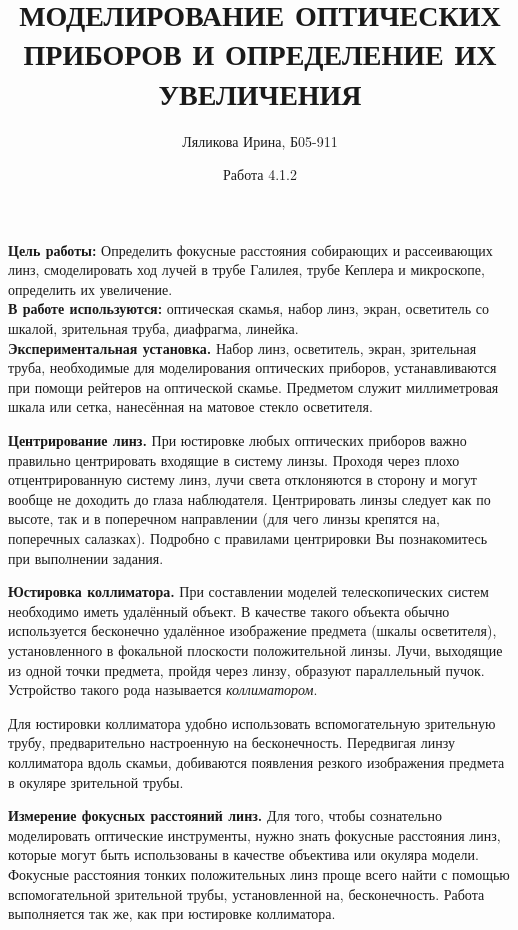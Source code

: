 \documentclass[a4paper,12pt]{article}
\title{МОДЕЛИРОВАНИЕ ОПТИЧЕСКИХ ПРИБОРОВ И ОПРЕДЕЛЕНИЕ ИХ УВЕЛИЧЕНИЯ}
\date{Работа 4.1.2}
\author{Ляликова Ирина, Б05-911}
\begin{document}
	
	\vspace{0.5 cm}
	\maketitle
	\vspace{0.5 cm}
	
	\textbf{Цель работы:} Определить фокусные расстояния собирающих и рассеивающих линз, смоделировать ход лучей в трубе Галилея, трубе Кеплера и микроскопе, определить их увеличение. \\
	
	\textbf{В работе используются:} оптическая скамья, набор линз, экран, осветитель со шкалой, зрительная труба, диафрагма, линейка.\\
	
	\textbf{Экспериментальная установка.} Набор линз, осветитель, экран, зрительная труба, необходимые для моделирования оптических приборов, устанавливаются при помощи рейтеров на оптической скамье. Предметом служит
	миллиметровая шкала или сетка, нанесённая на матовое стекло осветителя.
	
	\textbf{Центрирование линз.} При юстировке любых оптических приборов важно правильно центрировать входящие в систему линзы. Проходя через плохо
	отцентрированную систему линз, лучи света отклоняются в сторону и могут
	вообще не доходить до глаза наблюдателя. Центрировать линзы следует как
	по высоте, так и в поперечном направлении (для чего линзы крепятся на, поперечных салазках). Подробно с правилами центрировки Вы познакомитесь
	при выполнении задания.
	
	\textbf{Юстировка коллиматора.} При составлении моделей телескопических
	систем необходимо иметь удалённый объект. В качестве такого объекта обычно используется бесконечно удалённое изображение предмета (шкалы осветителя), установленного в фокальной плоскости положительной линзы. Лучи,
	выходящие из одной точки предмета, пройдя через линзу, образуют параллельный пучок. Устройство такого рода называется \textit{коллиматором}.

	Для юстировки коллиматора удобно использовать вспомогательную зрительную трубу, предварительно настроенную на бесконечность. Передвигая
	линзу коллиматора вдоль скамьи, добиваются появления резкого изображения предмета в окуляре зрительной трубы.
	
	\textbf{Измерение фокусных расстояний линз.} Для того, чтобы сознательно
	моделировать оптические инструменты, нужно знать фокусные расстояния
	линз, которые могут быть использованы в качестве объектива или окуляра модели. Фокусные расстояния тонких положительных линз проще всего
	найти с помощью вспомогательной зрительной трубы, установленной на, бесконечность. Работа выполняется так же, как при юстировке коллиматора.
	
\end{document}
